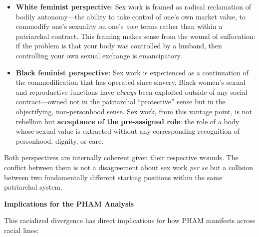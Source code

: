 \documentclass[12pt,openany]{book}
\numberwithin{equation}{chapter}
\begin{document}
\begin{itemize}
    \item \textbf{White feminist perspective}: Sex work is framed as radical reclamation of bodily autonomy---the ability to take control of one's own market value, to commodify one's sexuality on one's \textit{own} terms rather than within a patriarchal contract. This framing makes sense from the wound of suffocation: if the problem is that your body was controlled by a husband, then controlling your own sexual exchange is emancipatory.
    
    \item \textbf{Black feminist perspective}: Sex work is experienced as a continuation of the commodification that has operated since slavery. Black women's sexual and reproductive functions have \textit{always} been exploited outside of any social contract---owned not in the patriarchal ``protective'' sense but in the objectifying, non-personhood sense. Sex work, from this vantage point, is not rebellion but \textbf{acceptance of the pre-assigned role}: the role of a body whose sexual value is extracted without any corresponding recognition of personhood, dignity, or care.
\end{itemize}

Both perspectives are internally coherent given their respective wounds. The conflict between them is not a disagreement about sex work \textit{per se} but a collision between two fundamentally different starting positions within the same patriarchal system.

\textbf{Implications for the PHAM Analysis}

This racialized divergence has direct implications for how PHAM manifests across racial lines:
\end{document}
